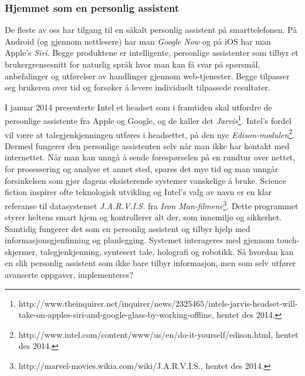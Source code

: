 {\subsubsection{Hjemmet som en personlig assistent}
De fleste av oss har tilgang til en såkalt personlig assistent på smarttelefonen. På Android (og gjennom nettlesere) har man \emph{Google Now} og på iOS har man Apple's \emph{Siri}. Begge produktene er intelligente, personlige assistenter som tilbyr et brukergrensesnitt for naturlig språk hvor man kan få svar på spørsmål, anbefalinger og utførelser av handlinger gjennom web-tjenester. Begge tilpasser seg brukeren over tid og forsøker å levere individuelt tilpassede resultater.

I januar 2014 presenterte Intel et headset som i framtiden skal utfordre de personlige assistente fra Apple og Google, og de kaller det \emph{Jarvis}\footnote{http://www.theinquirer.net/inquirer/news/2325465/intels-jarvis-headset-will-take-on-apples-siri-and-google-glass-by-working-offline, hentet des 2014.}. Intel's fordel vil være at talegjenkjenningen utføres i headsettet, på den nye \emph{Edison-modulen}\footnote{http://www.intel.com/content/www/us/en/do-it-yourself/edison.html, hentet des 2014.}. Dermed fungerer den personlige assistenten selv når man ikke har kontakt med internettet. Når man kan unngå å sende forespørselen på en rundtur over nettet, for prosessering og analyse et annet sted, spares det mye tid og man unngår forsinkelsen som gjør dagens eksisterende systemer vanskelige å bruke. Science fiction inspirer ofte teknologisk utvikling og Intel's valg av navn er en klar referanse til datasystemet \emph{J.A.R.V.I.S.} fra \emph{Iron Man-filmene}\footnote{http://marvel-movies.wikia.com/wiki/J.A.R.V.I.S., hentet des 2014.}. Dette programmet styrer heltens smart hjem og kontrollerer alt der, som innemiljø og sikkerhet. Samtidig fungerer det som en personlig assistent og tilbyr hjelp med informasjonsgjenfinning og planlegging. Systemet interageres med gjennom touch-skjermer, talegjenkjenning, syntesert tale, holografi og robotikk. Så hvordan kan en slik personlig assistent som ikke bare tilbyr informasjon, men som selv utfører avanserte oppgaver, implementeres?

}
